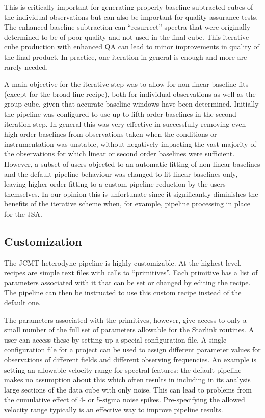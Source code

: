 \documentclass[final,authoryear,5p,times,twocolumn]{elsarticle}
\begin{document}
This is critically important for generating properly baseline-subtracted
cubes of the individual observations but can also
be important for quality-assurance tests. The enhanced baseline
subtraction can ``resurrect'' spectra that were originally determined
to be of poor quality and not used in the final cube. This iterative
cube production with enhanced QA can lead to minor improvements in
quality of the final product.  In practice,  one iteration in general is enough
and more are rarely needed.

A main objective for the iterative step was to allow for non-linear baseline fits
(except for the broad-line recipe), both for  individual observations as well as
the group cube, given that accurate baseline windows have been determined.
Initially the pipeline was configured to use up to fifth-order baselines in
the second iteration step. In general this was very effective in successfully
removing even high-order baselines from observations taken when the
conditions or instrumentation was unstable, without negatively impacting
the vast majority of the observations for which linear or second order baselines
were sufficient.  However, a subset of users objected to an automatic fitting of
non-linear baselines and the default pipeline behaviour was changed to
fit linear baselines only, leaving higher-order fitting to a custom pipeline reduction
by the users themselves.  In our opinion this is unfortunate since it significantly
diminishes the benefits of the iterative scheme when, for example, pipeline processing
in place for the JSA.

\subsection{Customization}

The JCMT heterodyne pipeline is highly customizable. At the highest level, recipes
are simple text files with calls to ``primitives''. Each primitive has a list of
parameters associated with it that can be set or changed by editing the recipe.
The pipeline can then be instructed to use this custom recipe instead of the default one.

The parameters associated with the primitives, however, give access to only a small
number of the full set of parameters allowable for the Starlink routines. A user can access
these by setting up a special configuration file. A single configuration file for a project can
be used to assign different parameter values for observations of different fields and
different observing frequencies. An example is setting an allowable velocity range for
spectral features: the default pipeline makes no assumption about this which often results
in including in its analysis large sections of the data cube with only noise. This can lead
to problems from the cumulative effect of 4- or 5-sigma noise spikes. Pre-specifying the
allowed velocity range typically is an effective way to improve pipeline results.
\end{document}
